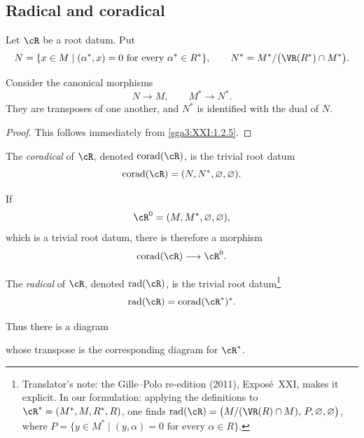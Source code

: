 \subsection{Radical and coradical}\label{sga3:XXI:6.3}

Let \(\cR\) be a root datum. Put
\[
 N=\{x\in M\mid(\alpha^\ast,x)=0
       \text{ for every }\alpha^\ast\in R^\ast\},
\qquad
 N^\ast=M^\ast/\bigl(\VR(R^\ast)\cap M^\ast\bigr).
\]

\begin{lemma}\label{sga3:XXI:6.3.1}
Consider the canonical morphisms
\[
 N\longrightarrow M,
 \qquad
 M^\ast\longrightarrow N^\ast.
\]
They are transposes of one another, and \(N^\ast\) is identified with
the dual of \(N\).
\end{lemma}

\begin{proof}
This follows immediately from \ref{sga3:XXI:1.2.5}.
\end{proof}

\begin{definition}\label{sga3:XXI:6.3.2}
The \emph{coradical} of \(\cR\), denoted
\(\operatorname{corad}(\cR)\), is the trivial root datum
\[
 \operatorname{corad}(\cR)=(N,N^\ast,\varnothing,\varnothing).
\]
\end{definition}

If
\[
 \cR^0=(M,M^\ast,\varnothing,\varnothing),
\]
which is a trivial root datum, there is therefore a morphism
\[
 \operatorname{corad}(\cR)\longrightarrow\cR^0.
\]

\begin{definition}\label{sga3:XXI:6.3.3}
The \emph{radical} of \(\cR\), denoted
\(\operatorname{rad}(\cR)\), is the trivial root datum\footnote{Translator's note: the Gille--Polo re-edition (2011), Exposé~XXI, makes it
explicit. In our formulation: applying the definitions to \(\cR^\ast=(M^\ast,M,R^\ast,R)\),
one finds
\(\operatorname{rad}(\cR)=\bigl(M/(\VR(R)\cap M),\,P,\varnothing,\varnothing\bigr)\), where
\(P=\{y\in M^\ast\mid(y,\alpha)=0\text{ for every }\alpha\in R\}\).}
\[
 \operatorname{rad}(\cR)=\operatorname{corad}(\cR^\ast)^\ast.
\]
\end{definition}

Thus there is a diagram
\begin{center}
\end{center}
whose transpose is the corresponding diagram for \(\cR^\ast\).


